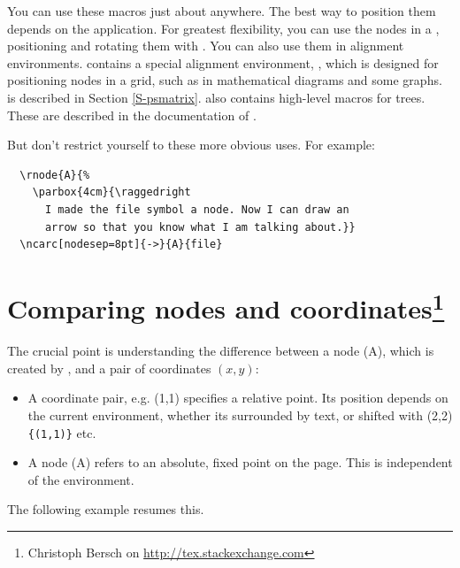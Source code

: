 \documentclass[fontsize=11pt,english,BCOR=10mm,DIV=12,bibliography=totoc,parskip=false,headings=small,
    headinclude=false,footinclude=false,oneside]{pst-doc}
\begin{document}
You can use these macros just about anywhere. The best way to position them
depends on the application. For greatest flexibility, you can use the nodes in
a , positioning and rotating them with . You can also use
them in alignment environments.  contains a special alignment
environment, , which is designed for positioning nodes in a grid,
such as in mathematical diagrams and some graphs.  is described in
Section \ref{S-psmatrix}.  also contains high-level macros for
trees. These are described in the documentation of .

But don't restrict yourself to these more obvious uses. For example:
\begin{center}
\end{center}

\begin{lstlisting}
  \rnode{A}{%
    \parbox{4cm}{\raggedright
      I made the file symbol a node. Now I can draw an
      arrow so that you know what I am talking about.}}
  \ncarc[nodesep=8pt]{->}{A}{file}
\end{lstlisting}


\section[Comparing nodes and coordinates]%
  {Comparing nodes and coordinates\footnote{Christoph Bersch on \url{http://tex.stackexchange.com}}}

The crucial point is understanding the difference between a node (A), which is created by ,
 and a pair of coordinates $(x,y)$:

\begin{itemize}
\item
    A coordinate pair, e.g. (1,1) specifies a relative point. 
    Its position depends on the current environment, whether its surrounded by  
    text, or shifted with (2,2)\texttt{\{(1,1)\}} etc.
\item
    A node (A) refers to an absolute, fixed point on the page. This is independent of the environment.
\end{itemize}

The following example resumes this.
\end{document}
